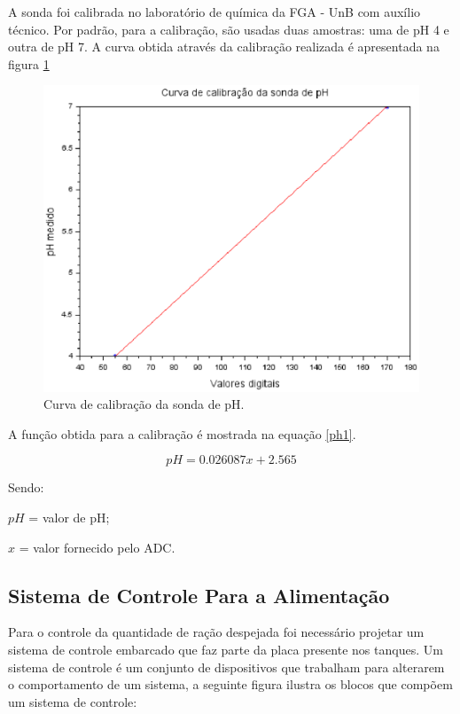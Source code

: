 \pagebreak

A sonda foi calibrada no laboratório de química da FGA - UnB com auxílio técnico. Por padrão, para a calibração, são usadas duas amostras: uma de pH 4 e outra de pH 7. A curva obtida através da calibração realizada é apresentada na figura \ref{pH_cal}

\begin{figure}[h]
	\centering
	\includegraphics[keepaspectratio=true,scale=0.7]{figuras/pH_cal}
	\caption{Curva de calibração da sonda de pH.}
	\label{pH_cal}
\end{figure}

A função obtida para a calibração é mostrada na equação \ref{ph1}.

\begin{equation}
\label{ph1}
    pH = 0.026087x + 2.565
\end{equation}

Sendo:

$pH$ = valor de pH;

$x$ = valor fornecido pelo ADC.

\subsection{Sistema de Controle Para a Alimentação}

Para o controle da quantidade de ração despejada foi necessário projetar um sistema de controle embarcado que faz parte da placa presente nos tanques. Um sistema de controle é um conjunto de dispositivos que trabalham para alterarem o comportamento de um sistema, a seguinte figura ilustra os blocos que compõem um sistema de controle:

